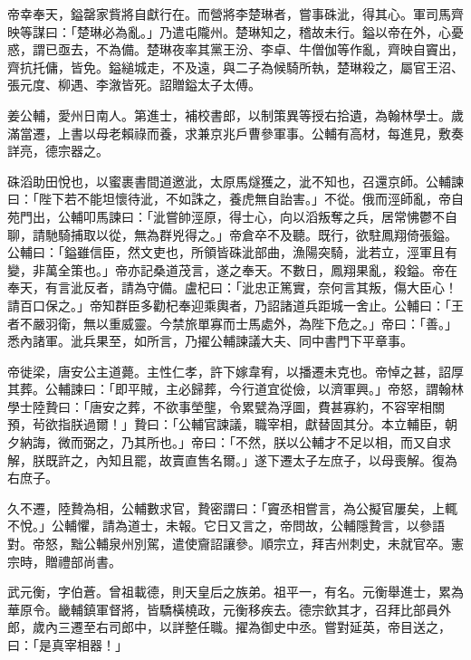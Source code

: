 \begin{pinyinscope}
 帝幸奉天，鎰罄家貲將自獻行在。而營將李楚琳者，嘗事硃泚，得其心。軍司馬齊映等謀曰：「楚琳必為亂。」乃遣屯隴州。楚琳知之，稽故未行。鎰以帝在外，心憂惑，謂已亟去，不為備。楚琳夜率其黨王汾、李卓、牛僧伽等作亂，齊映自竇出，齊抗托傭，皆免。鎰縋城走，不及遠，與二子為候騎所執，楚琳殺之，屬官王沼、張元度、柳遇、李漵皆死。詔贈鎰太子太傅。



 姜公輔，愛州日南人。第進士，補校書郎，以制策異等授右拾遺，為翰林學士。歲滿當遷，上書以母老賴祿而養，求兼京兆戶曹參軍事。公輔有高材，每進見，敷奏詳亮，德宗器之。



 硃滔助田悅也，以蜜裹書間道邀泚，太原馬燧獲之，泚不知也，召還京師。公輔諫曰：「陛下若不能坦懷待泚，不如誅之，養虎無自詒害。」不從。俄而涇師亂，帝自苑門出，公輔叩馬諫曰：「泚嘗帥涇原，得士心，向以滔叛奪之兵，居常怫鬱不自聊，請馳騎捕取以從，無為群兇得之。」帝倉卒不及聽。既行，欲駐鳳翔倚張鎰。公輔曰：「鎰雖信臣，然文吏也，所領皆硃泚部曲，漁陽突騎，泚若立，涇軍且有變，非萬全策也。」帝亦記桑道茂言，遂之奉天。不數日，鳳翔果亂，殺鎰。帝在奉天，有言泚反者，請為守備。盧杞曰：「泚忠正篤實，奈何言其叛，傷大臣心！請百口保之。」帝知群臣多勸杞奉迎乘輿者，乃詔諸道兵距城一舍止。公輔曰：「王者不嚴羽衛，無以重威靈。今禁旅單寡而士馬處外，為陛下危之。」帝曰：「善。」悉內諸軍。泚兵果至，如所言，乃擢公輔諫議大夫、同中書門下平章事。



 帝徙梁，唐安公主道薨。主性仁孝，許下嫁韋宥，以播遷未克也。帝悼之甚，詔厚其葬。公輔諫曰：「即平賊，主必歸葬，今行道宜從儉，以濟軍興。」帝怒，謂翰林學士陸贄曰：「唐安之葬，不欲事塋壟，令累甓為浮圖，費甚寡約，不容宰相關預，茍欲指朕過爾！」贄曰：「公輔官諫議，職宰相，獻替固其分。本立輔臣，朝夕納誨，微而弼之，乃其所也。」帝曰：「不然，朕以公輔才不足以相，而又自求解，朕既許之，內知且罷，故賣直售名爾。」遂下遷太子左庶子，以母喪解。復為右庶子。



 久不遷，陸贄為相，公輔數求官，贄密謂曰：「竇丞相嘗言，為公擬官屢矣，上輒不悅。」公輔懼，請為道士，未報。它日又言之，帝問故，公輔隱贄言，以參語對。帝怒，黜公輔泉州別駕，遣使齎詔讓參。順宗立，拜吉州刺史，未就官卒。憲宗時，贈禮部尚書。



 武元衡，字伯蒼。曾祖載德，則天皇后之族弟。祖平一，有名。元衡舉進士，累為華原令。畿輔鎮軍督將，皆驕橫橈政，元衡移疾去。德宗欽其才，召拜比部員外郎，歲內三遷至右司郎中，以詳整任職。擢為御史中丞。嘗對延英，帝目送之，曰：「是真宰相器！」




\end{pinyinscope}
